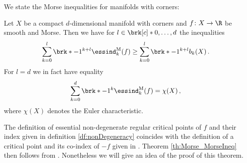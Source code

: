 We state the Morse inequalities for manifolds with corners:
\begin{theorem}
  \label{th:Morse_MorseIneq}
  Let $X$ be a compact $d$-dimensional manifold with corners and $f\colon X\to\R$ be smooth and Morse.
  Then we have for $l\in\brk[c]*{0,\dots,d}$ the inequalities
  \begin{align}
    \sum_{k=0}^l \brk*{-1}^{k+l}\essind_k^\text{M}(f)\geq \sum_{k=0}^l\brk*{-1}^{k+l}b_k(X)\,.
    \label{eq:MorseIneq_inequality}
  \end{align}
  For $l=d$ we in fact have equality
  \begin{align}
    \sum_{k=0}^d \brk*{-1}^{k}\essind_k^\text{M}(f)= \chi(X)\label{eq:MorseIneq_equality}\,,
  \end{align}
  where $\chi(X)$ denotes the Euler characteristic.
\end{theorem}
  The definition of essential non-degenerate regular critical points of $f$ and their index given in definition \ref{df:nonDegeneracy} coincides with 
  the definition of a critical point and its co-index of $-f$ given in \cite{Agrach1991}.
  Theorem \ref{th:Morse_MorseIneq} then follows from \cite[Theorem 2.4]{Agrach1991}.
  Nonetheless we will give an idea of the proof of this theorem.

